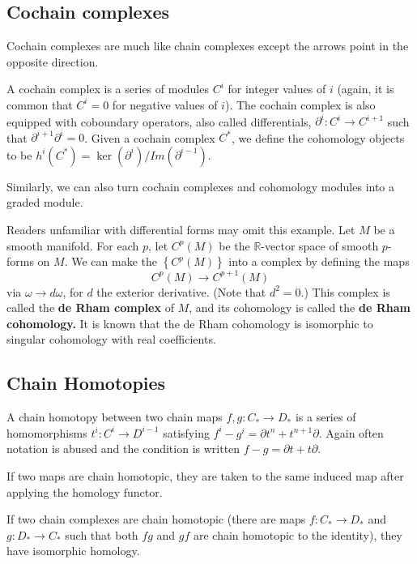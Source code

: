 \subsection{Cochain complexes}
Cochain complexes are much like chain complexes except the
arrows point in the
opposite direction.
\begin{definition} A cochain complex is a series of modules
$C^i$ for integer
values of $i$ (again, it is common that $C^i=0$ for negative
values of $i$). The
cochain complex is also equipped with coboundary operators, also
called
differentials, $\partial^i:C^i\rightarrow C^{i+1}$ such that
$\partial^{i+1}\partial^i=0$. Given a cochain complex $C^*$, we
define the
cohomology objects to be
$h^i(C^*)=\ker(\partial^i)/Im(\partial^{i-1})$.
\end{definition}
Similarly, we can also turn cochain complexes and cohomology
modules into a
graded module.


\begin{example} Readers unfamiliar with differential
forms may omit this example. Let $M$ be a smooth manifold. For each $p$, let
$C^p(M)$ be the $\mathbb{R}$-vector space of smooth $p$-forms on $M$.
We can make the $\left\{C^p(M)\right\}$ into a complex by defining the maps
\[ C^p(M) \to C^{p+1}(M)  \]
via $\omega \to d \omega$, for $d$ the exterior derivative. 
(Note that $d^2 = 0$.)  This complex is called the \textbf{de Rham complex} of
$M$, and its cohomology is called the \textbf{de Rham cohomology.} It is known
that the de Rham cohomology is isomorphic to singular cohomology with real
coefficients. 
\end{example} 

\subsection{Chain Homotopies}
\begin{definition} A chain homotopy between two chain maps
$f,g:C_*\rightarrow D_*$ is a series of homomorphisms
$t^i:C^i\rightarrow D^{i-1}$ satisfying $f^i-g^i=\partial t^n+
t^{n+1}\partial$. Again often notation is abused and the
condition is written $f-g=\partial t +
t\partial$.\end{definition}
\begin{theorem} If two maps are chain homotopic, they are taken
to the same induced map after applying the homology functor.
\end{theorem}
\begin{corollary} If two chain complexes are chain homotopic
(there are maps $f: C_*\rightarrow D_*$ and $g:D_*\rightarrow
C_*$ such that both $fg$ and $gf$ are chain homotopic to the
identity), they have isomorphic homology. \end{corollary}

